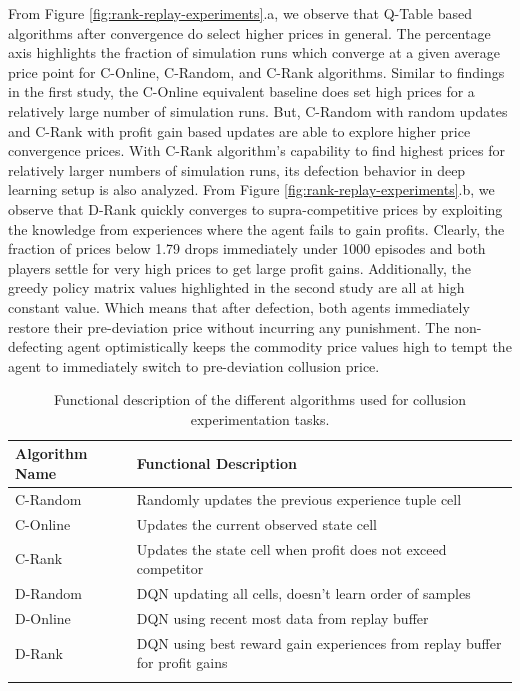 \documentclass{article}
\begin{document}
From Figure \ref{fig:rank-replay-experiments}.a, we observe that Q-Table based algorithms after convergence do select higher prices in general.
The percentage axis highlights the fraction of simulation runs which converge at a given average price point for C-Online, C-Random, and C-Rank algorithms.
Similar to findings in the first study, the C-Online equivalent baseline does set high prices for a relatively large number of simulation runs.
But, C-Random with random updates and C-Rank with profit gain based updates are able to explore higher price convergence prices.
With C-Rank algorithm’s capability to find highest prices for relatively larger numbers of simulation runs, its defection behavior in deep learning setup is also analyzed.
From Figure \ref{fig:rank-replay-experiments}.b, we observe that D-Rank quickly converges to supra-competitive prices by exploiting the knowledge from experiences where the agent fails to gain profits.
Clearly, the fraction of prices below 1.79 drops immediately under 1000 episodes and both players settle for very high prices to get large profit gains.
Additionally, the greedy policy matrix values highlighted in the second study are all at high constant value.
Which means that after defection, both agents immediately restore their pre-deviation price without incurring any punishment.
The non-defecting agent optimistically keeps the commodity price values high to tempt the agent to immediately switch to pre-deviation collusion price.


\begin{table}[t]
\centering
\caption{Functional description of the different algorithms used for collusion experimentation tasks.}
     \label{table_algorithm_description}
    \begin{center}
        \begin{tabular}{ll}
        \toprule
            Algorithm Name & Functional Description \\
        \midrule 
             C-Random & Randomly updates the previous experience tuple cell \\
             C-Online & Updates the current observed state cell \\
             C-Rank & Updates the state cell when profit does not exceed competitor \\
             D-Random & DQN updating all cells, doesn't learn order of samples  \\
             D-Online & DQN using recent most data from replay buffer \\
             D-Rank & DQN using best reward gain experiences from replay buffer for profit gains \\
        \bottomrule
        \\
       \end{tabular}
     \end{center}
\end{table}
\end{document}
